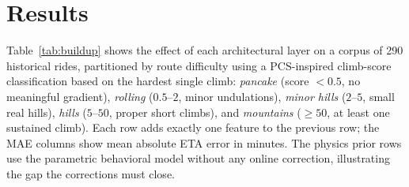 \documentclass[11pt,a4paper]{article}
\begin{document}
\section{Results}
\label{sec:results}

Table~\ref{tab:buildup} shows the effect of each architectural layer
on a corpus of 290 historical rides, partitioned by route difficulty
using a PCS-inspired climb-score classification based on the hardest
single climb: \emph{pancake} (score $< 0.5$, no meaningful gradient),
\emph{rolling} ($0.5$--$2$, minor undulations),
\emph{minor hills} ($2$--$5$, small real hills),
\emph{hills} ($5$--$50$, proper short climbs),
and \emph{mountains} ($\ge 50$, at least one sustained climb).
Each row adds exactly one feature to the previous row; the MAE
columns show mean absolute ETA error in minutes. The physics prior
rows use the parametric behavioral model without any online
correction, illustrating the gap the corrections must close.
\end{document}
